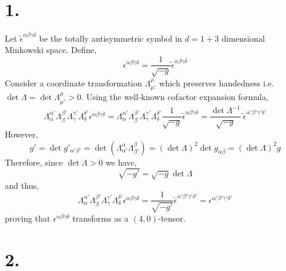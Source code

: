 \documentclass[12pt]{article}
\begin{document}

\section*{1.}

Let $\tilde{\epsilon}^{\alpha \beta \gamma \delta}$ be the totally antisymmetric symbol in $d = 1 + 3$ dimensional Minkowski space. Define, 
\[ \epsilon^{\alpha \beta \gamma \delta} = \frac{1}{\sqrt{-g}} \tilde{\epsilon}^{\alpha \beta \gamma \delta} \]
 Consider a coordinate transformation $\Lambda^\mu_{\mu'}$ which preserves handedness i.e. $\det{\Lambda} = \det{\Lambda^{\mu}_{\mu'}} > 0$. 
Using the well-known cofactor expansion formula,
\[ \Lambda^{\alpha'}_{\alpha} \Lambda^{\beta'}_{\beta} \Lambda^{\gamma'}_{\gamma} \Lambda^{\delta'}_{\delta} \epsilon^{\alpha \beta \gamma \delta} = \Lambda^{\alpha'}_{\alpha} \Lambda^{\beta'}_{\beta} \Lambda^{\gamma'}_{\gamma} \Lambda^{\delta'}_{\delta} \frac{1}{\sqrt{-g}} \tilde{\epsilon}^{\alpha \beta \gamma \delta} = \frac{\det{\Lambda^{-1}}}{\sqrt{- g}}  \: \tilde{\epsilon}^{\alpha' \beta' \gamma' \delta'}   \]
However, 
\[ g' = \det{g'_{\alpha' \beta'}} = \det{(\Lambda^\alpha_{\alpha'} \Lambda^{\beta}_{\beta'})} = (\det{\Lambda})^2 \det{g_{\alpha \beta}} = (\det{\Lambda})^2 g \]
Therefore, since $\det{\Lambda} > 0$ we have,
\[ \sqrt{-g'} = \sqrt{-g} \det{\Lambda} \] 
and thus,
\[ \Lambda^{\alpha'}_{\alpha} \Lambda^{\beta'}_{\beta} \Lambda^{\gamma'}_{\gamma} \Lambda^{\delta'}_{\delta} \epsilon^{\alpha \beta \gamma \delta} = \frac{1}{\sqrt{-g'}} \tilde{\epsilon}^{\alpha' \beta' \gamma' \delta'} = \epsilon^{\alpha' \beta' \gamma' \delta'} \]
proving that $\epsilon^{\alpha \beta \gamma \delta}$ transforms as a $(4, 0)$-tensor.

\section*{2.}
\end{document}
